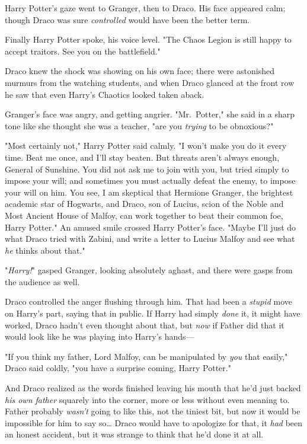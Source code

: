 Harry Potter's gaze went to Granger, then to Draco. His face appeared calm; 
though Draco was sure \emph{controlled} would have been the better term.

Finally Harry Potter spoke, his voice level. "The Chaos Legion is still happy 
to accept traitors. See you on the battlefield."

Draco knew the shock was showing on his own face; there were astonished murmurs 
from the watching students, and when Draco glanced at the front row he saw that 
even Harry's Chaotics looked taken aback.

Granger's face was angry, and getting angrier. "Mr.~Potter," she said in a 
sharp tone like she thought she was a teacher, "are you \emph{trying} to be 
obnoxious?"

"Most certainly not," Harry Potter said calmly. "I won't make you do it every 
time. Beat me once, and I'll stay beaten. But threats aren't always enough, 
General of Sunshine. You did not ask me to join with you, but tried simply to 
impose your will; and sometimes you must actually defeat the enemy, to impose 
your will on him. You see, I am skeptical that Hermione Granger, the brightest 
academic star of Hogwarts, and Draco, son of Lucius, scion of the Noble and 
Most Ancient House of Malfoy, can work together to beat their common foe, Harry 
Potter." An amused smile crossed Harry Potter's face. "Maybe I'll just do what 
Draco tried with Zabini, and write a letter to Lucius Malfoy and see what 
\emph{he} thinks about that."

"\emph{Harry!}" gasped Granger, looking absolutely aghast, and there were gasps 
from the audience as well.

Draco controlled the anger flushing through him. That had been a \emph{stupid} 
move on Harry's part, saying that in public. If Harry had simply \emph{done} 
it, it might have worked, Draco hadn't even thought about that, but \emph{now} 
if Father did that it would look like he was playing into Harry's hands---

"If you think my father, Lord Malfoy, can be manipulated by \emph{you} that 
easily," Draco said coldly, "you have a surprise coming, Harry Potter."

And Draco realized as the words finished leaving his mouth that he'd just 
backed \emph{his own father} squarely into the corner, more or less without 
even meaning to. Father probably \emph{wasn't} going to like this, not the 
tiniest bit, but now it would be impossible for him to say so{\ldots} Draco 
would have to apologize for that, it \emph{had} been an honest accident, but it 
was strange to think that he'd done it at all.

